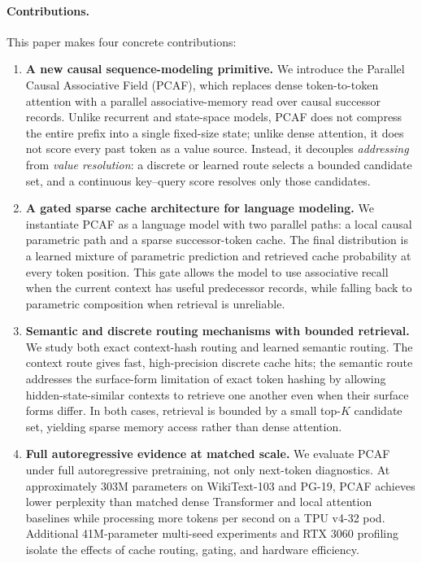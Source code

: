 \documentclass{article}
\begin{document}
\paragraph{Contributions.}
This paper makes four concrete contributions:
\begin{enumerate}
  \item \textbf{A new causal sequence-modeling primitive.}
  We introduce the Parallel Causal Associative Field (PCAF), which replaces
  dense token-to-token attention with a parallel associative-memory read over
  causal successor records. Unlike recurrent and state-space models, PCAF does
  not compress the entire prefix into a single fixed-size state; unlike dense
  attention, it does not score every past token as a value source. Instead, it
  decouples \emph{addressing} from \emph{value resolution}: a discrete or
  learned route selects a bounded candidate set, and a continuous key--query
  score resolves only those candidates.

  \item \textbf{A gated sparse cache architecture for language modeling.}
  We instantiate PCAF as a language model with two parallel paths: a local
  causal parametric path and a sparse successor-token cache. The final
  distribution is a learned mixture of parametric prediction and retrieved
  cache probability at every token position. This gate allows the model to use
  associative recall when the current context has useful predecessor records,
  while falling back to parametric composition when retrieval is unreliable.

  \item \textbf{Semantic and discrete routing mechanisms with bounded
  retrieval.}
  We study both exact context-hash routing and learned semantic routing. The
  context route gives fast, high-precision discrete cache hits; the semantic
  route addresses the surface-form limitation of exact token hashing by allowing
  hidden-state-similar contexts to retrieve one another even when their surface
  forms differ. In both cases, retrieval is bounded by a small top-$K$ candidate
  set, yielding sparse memory access rather than dense attention.

  \item \textbf{Full autoregressive evidence at matched scale.}
  We evaluate PCAF under full autoregressive pretraining, not only next-token
  diagnostics. At approximately 303M parameters on WikiText-103 and PG-19,
  PCAF achieves lower perplexity than matched dense Transformer and local
  attention baselines while processing more tokens per second on a TPU v4-32
  pod. Additional 41M-parameter multi-seed experiments and RTX 3060 profiling
  isolate the effects of cache routing, gating, and hardware efficiency.
\end{enumerate}
\end{document}
